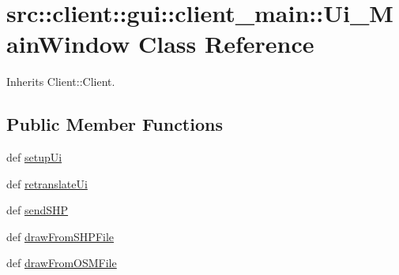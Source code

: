 \hypertarget{classsrc_1_1client_1_1gui_1_1client__main_1_1Ui__MainWindow}{
\section{src::client::gui::client\_\-main::Ui\_\-MainWindow Class Reference}
\label{classsrc_1_1client_1_1gui_1_1client__main_1_1Ui__MainWindow}
}


Inherits Client::Client.

\subsection*{Public Member Functions}
\begin{DoxyCompactItemize}
\item 
def \hyperlink{classsrc_1_1client_1_1gui_1_1client__main_1_1Ui__MainWindow_a18e21715fbea4f359eda51e3fb566566}{setupUi}
\item 
def \hyperlink{classsrc_1_1client_1_1gui_1_1client__main_1_1Ui__MainWindow_af5e5ea9f5cc29c2b5bcc37ddf66a43d4}{retranslateUi}
\item 
def \hyperlink{classsrc_1_1client_1_1gui_1_1client__main_1_1Ui__MainWindow_a0fd7a48cc70a1a254165b6388b57ab8a}{sendSHP}
\item 
def \hyperlink{classsrc_1_1client_1_1gui_1_1client__main_1_1Ui__MainWindow_ac024fe8fdfa6ecc540d17685c25aa3c6}{drawFromSHPFile}
\item 
def \hyperlink{classsrc_1_1client_1_1gui_1_1client__main_1_1Ui__MainWindow_a9fc02c87cbc80cd2c74f230513320c9b}{drawFromOSMFile}
\end{DoxyCompactItemize}
